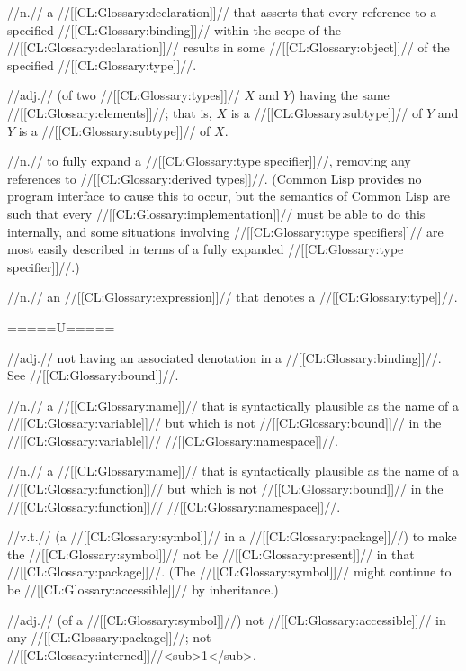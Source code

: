  //n.// a //[[CL:Glossary:declaration]]// that asserts that every reference to a specified //[[CL:Glossary:binding]]// within the scope of the //[[CL:Glossary:declaration]]// results in some //[[CL:Glossary:object]]// of the specified //[[CL:Glossary:type]]//.

 //adj.// (of two //[[CL:Glossary:types]]// $X$ and $Y$) having the same //[[CL:Glossary:elements]]//; that is, $X$ is a //[[CL:Glossary:subtype]]// of $Y$ and $Y$ is a //[[CL:Glossary:subtype]]// of $X$.

 //n.// to fully expand a //[[CL:Glossary:type specifier]]//, removing any references to //[[CL:Glossary:derived types]]//. (Common Lisp provides no program interface to cause this to occur, but the semantics of Common Lisp are such that every //[[CL:Glossary:implementation]]// must be able to do this internally, and some situations involving //[[CL:Glossary:type specifiers]]// are most easily described in terms of a fully expanded //[[CL:Glossary:type specifier]]//.)

 //n.// an //[[CL:Glossary:expression]]// that denotes a //[[CL:Glossary:type]]//. 

=====U=====
 
 //adj.// not having an associated denotation in a //[[CL:Glossary:binding]]//. See //[[CL:Glossary:bound]]//.
 
 //n.// a //[[CL:Glossary:name]]// that is syntactically plausible as the name of a //[[CL:Glossary:variable]]// but which is not //[[CL:Glossary:bound]]// in the //[[CL:Glossary:variable]]// //[[CL:Glossary:namespace]]//.

 //n.// a //[[CL:Glossary:name]]// that is syntactically plausible as the name of a //[[CL:Glossary:function]]// but which is not //[[CL:Glossary:bound]]// in the //[[CL:Glossary:function]]// //[[CL:Glossary:namespace]]//.

 //v.t.// (a //[[CL:Glossary:symbol]]// in a //[[CL:Glossary:package]]//) to make the //[[CL:Glossary:symbol]]// not be //[[CL:Glossary:present]]// in that //[[CL:Glossary:package]]//. (The //[[CL:Glossary:symbol]]// might continue to be //[[CL:Glossary:accessible]]// by inheritance.)

 //adj.// (of a //[[CL:Glossary:symbol]]//) not //[[CL:Glossary:accessible]]// in any //[[CL:Glossary:package]]//; \ie not //[[CL:Glossary:interned]]//<sub>1</sub>.

